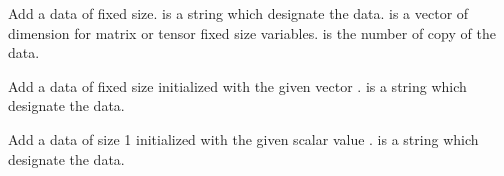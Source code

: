 \documentclass[a4paper,11pt,english]{sphinxmanual}
\begin{document}

\begin{fulllineitems}
\label{\detokenize{userdoc/model_object:_CPPv4N6getfem5model19add_fixed_size_dataE4name5sizes5niter}}%
\pysigstartmultiline
{}%
\pysigstopmultiline
Add a data of fixed size.  is a string which designate the data.
 is a vector of dimension for matrix or tensor fixed
size variables.  is the number of copy of the data.

\end{fulllineitems}


\begin{fulllineitems}
\label{\detokenize{userdoc/model_object:_CPPv4N6getfem5model31add_initialized_fixed_size_dataE4name1V}}%
\pysigstartmultiline
{}%
\pysigstopmultiline
Add a data of fixed size initialized with the given vector .  is a
string which designate the data.

\end{fulllineitems}


\begin{fulllineitems}
\label{\detokenize{userdoc/model_object:_CPPv4N6getfem5model27add_initialized_scalar_dataE4name1e}}%
\pysigstartmultiline
{}%
\pysigstopmultiline
Add a data of size 1 initialized with the given scalar value .  is
a string which designate the data.

\end{fulllineitems}
\end{document}
